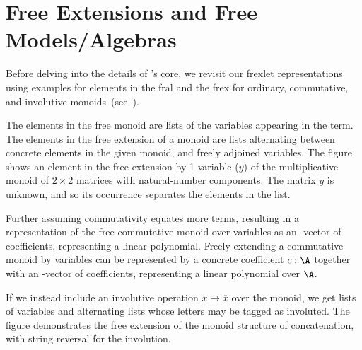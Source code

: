 \section{Free Extensions and Free Models/Algebras}

Before delving into the details of \Frexlib{}'s core, we revisit
our frexlet representations using examples for elements in the
fral and the frex for ordinary, commutative, and involutive monoids~(see~).

The elements in the free monoid are lists of the variables appearing
in the term. The elements in the free extension of a
monoid are lists alternating between concrete elements in the given
monoid, and freely adjoined variables. The figure shows an element
in the free extension by 1 variable ($y$) of the multiplicative monoid
of $2\times2$ matrices with natural-number components. The matrix $y$
is unknown, and so its occurrence separates the elements in the list.

Further assuming commutativity equates more terms, resulting
in a representation of the free commutative monoid over \nvar{}
variables as an \nvar-vector of coefficients, representing a linear
polynomial. Freely extending a commutative monoid \A{} by
\nvar{} variables can be represented by a concrete coefficient $c :
\A$ together with an \nvar{}-vector of coefficients, representing a
linear polynomial over $\A$.

If we instead include an involutive operation $x \mapsto
\overline x$ over the monoid, we get lists of variables and alternating lists
whose letters may be tagged as involuted. The figure demonstrates
the free extension of the monoid structure of \String{} concatenation,
with string reversal for the involution.

